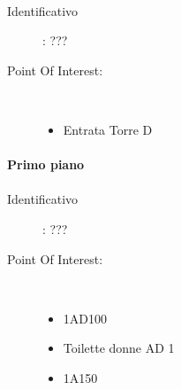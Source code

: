 \documentclass[../SperimentazioniPratiche.tex]{subfiles}
\begin{document}
			\paragraph*{}
			\label{00003}
			\begin{tcolorbox}[fonttitle=\bfseries, 
								adjusted title={\Large Beacon 00003},
								sharp corners=south,
								colback=white, 
								colframe=white!50!blue!75!black]
								
				\begin{description}%
					\item[Identificativo]: ???

					\tcbline					
					
					\item[Point Of Interest:] \ \par
					\begin{itemize}
						\item Entrata Torre D
					\end{itemize}					   				
				\end{description}  				
			\end{tcolorbox}
			

			
		\paragraph{Primo piano}			
			
			\paragraph*{}
			\label{01000}
			\begin{tcolorbox}[fonttitle=\bfseries, 
								adjusted title={\Large Beacon 01000},
								sharp corners=south,
								colback=white, 
								colframe=white!50!blue!75!black]
								
				\begin{description}
					\item[Identificativo]: ???

					\tcbline					
					
					\item[Point Of Interest:] \ \par
					\begin{itemize}
						\item 1AD100
						\item Toilette donne AD 1
						\item 1A150
					\end{itemize}					   				
				\end{description}  				
			\end{tcolorbox}
			
\end{document}
